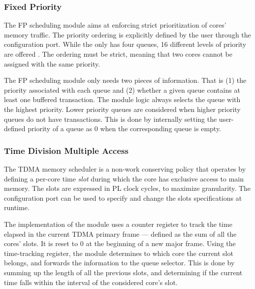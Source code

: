 \subsubsection{Fixed Priority}\label{sec:fixed_prio}
The FP scheduling module aims at enforcing strict prioritization of
cores' memory traffic. The priority ordering is explicitly defined by
the user through the configuration port. While the \schim {} only has four queues, 16 different levels of priority are offered
. The ordering
must be strict, meaning that two cores cannot be assigned with the same priority.

The FP scheduling module only needs two pieces of information. That is
(1) the priority associated with each queue and (2) whether a given
queue contains at least one buffered transaction. The module logic
always selects the queue with the highest priority. Lower priority
queues are considered when higher priority queues do not have
transactions. This is done by internally setting the user-defined
priority of a queue as 0 when the corresponding queue is empty.

\subsubsection{Time Division Multiple Access}
The TDMA memory scheduler is a non-work conserving policy that
operates by defining a per-core time \emph{slot} during which the core
has exclusive access to main memory.  The slots are expressed in PL
clock cycles, to maximize granularity. The configuration port can be
used to specify and change the slots specifications at runtime.

The implementation of the module uses a counter register to track the
time elapsed in the current TDMA primary frame --- defined as the sum of
all the cores' slots. It is reset to 0 at the beginning of a new major
frame. Using the time-tracking register, the module determines to
which core the current slot belongs, and forwards the information to
the queue selector. This is done by summing up the length of all the
previous slots, and determining if the current time falls within the
interval of the considered core's slot.

\color{red}
